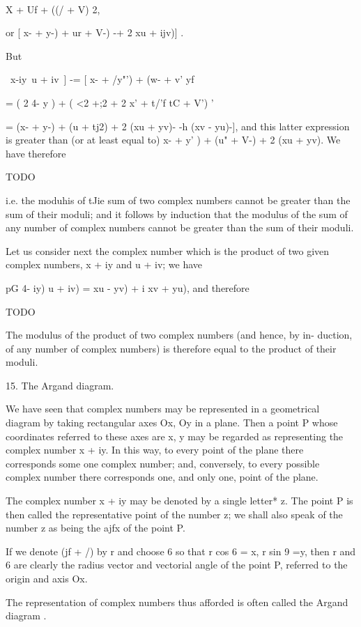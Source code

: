 \ \ {X + Uf + ((/ + V) 2,

or [ x- + y-) + ur + V-) -+ 2 xu + ijv)] .

But

 \ x-\-iy\-\-\ u + iv\ ] -= [ x- + /y"') + (w- + v' yf

= ( 2 4- y ) + ( <2 +;2 + 2 x' + t/'f tC + V') '

= (x- + y-) + (u + tj2) + 2 (xu + yv)- -h (xv - yu)-], and this
latter expression is greater than (or at least equal to) x- + y' ) +
(u" + V-) + 2 (xu + yv). We have therefore

TODO

i.e. the moduhis of tJie sum of two complex numbers cannot be greater
than the sum of their moduli; and it follows by induction that the
modulus of the sum of any number of complex numbers cannot be greater
than the sum of their moduli.

%
%

Let us consider next the complex number which is the product of two
given complex numbers, x + iy and u + iv; we have

 pG 4- iy) u + iv) = xu - yv) + i xv + yu), and therefore

TODO

The modulus of the product of two complex numbers (and hence, by in-
duction, of any number of complex numbers) is therefore equal to the
product of their moduli.

15. The Argand diagram.

We have seen that complex numbers may be represented in a geometrical
diagram by taking rectangular axes Ox, Oy in a plane. Then a point P
whose coordinates referred to these axes are x, y may be regarded as
representing the complex number x + iy. In this way, to every point of
the plane there corresponds some one complex number; and, conversely,
to every possible complex number there corresponds one, and only one,
point of the plane.

The complex number x + iy may be denoted by a single letter* z. The
point P is then called the representative point of the number z; we
shall also speak of the number z as being the ajfx of the point P.

If we denote (jf + /) by r and choose 6 so that r cos 6 = x, r sin 9
=y, then r and 6 are clearly the radius vector and vectorial angle of
the point P, referred to the origin and axis Ox.

The representation of complex numbers thus afforded is often called
the Argand diagram .

}
